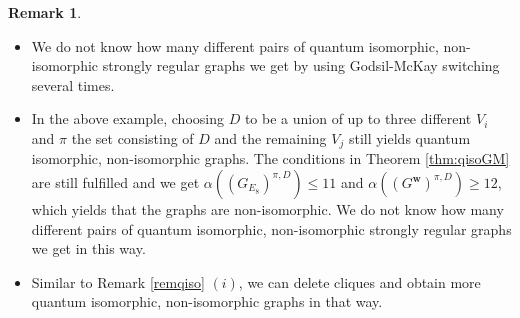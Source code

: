 \documentclass[11pt]{article}
\theoremstyle{definition}
\newtheorem{rema}[theo]{Remark}
\numberwithin{equation}{section}
\begin{document}
\begin{rema}
\begin{itemize}
    \item[(i)] We do not know how many different pairs of quantum isomorphic, non-isomorphic strongly regular graphs we get by using Godsil-McKay switching several times. 
    \item[(ii)] In the above example, choosing $D$ to be a union of up to three different $V_i$ and $\pi$ the set consisting of $D$ and the remaining $V_j$ still yields quantum isomorphic, non-isomorphic graphs. The conditions in Theorem \ref{thm:qisoGM} are still fulfilled and we get $\alpha((G_{E_8})^{\pi, D})\leq 11$ and $\alpha((G^{\boldsymbol{w}})^{\pi, D})\geq 12$, which yields that the graphs are non-isomorphic. We do not know how many different pairs of quantum isomorphic, non-isomorphic strongly regular graphs we get in this way. 
    \item[(iii)] Similar to Remark \ref{remqiso} $(i)$, we can delete cliques and obtain more quantum isomorphic, non-isomorphic graphs in that way. 
\end{itemize}
\end{rema}
\end{document}

